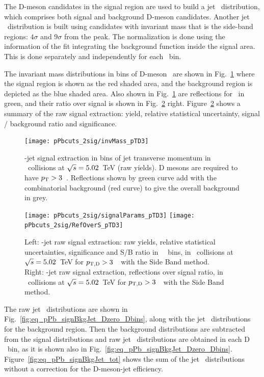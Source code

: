 The D-meson candidates in the signal region are used to build a jet \pt\ distribution, which comprises both signal and background D-meson candidates.
Another jet \pt\ distribution is built using candidates with invariant mass that is the side-band regions: $4\sigma$ and $9\sigma$ from the peak.
The normalization is done using the information of the fit integrating the background function inside the signal area. This is done separately and independently for each \ptd\ bin.


The invariant mass distributions in bins of D-meson \pt\ are shown in Fig.~\ref{fig:eq_pPb_InvMass_Dzero_Dbins} where  the signal region is shown as the red shaded area, and the background region is depicted as the blue shaded area.
Also shown in Fig.~\ref{fig:eq_pPb_InvMass_Dzero_Dbins} are reflections for \Dzero\ in green, and their ratio over signal is shown in Fig.~\ref{fig:eq_pPb_RSU_raw_Dbins_Dzero} right.
Figure~\ref{fig:eq_pPb_RSU_raw_Dbins_Dzero} shows a summary of the raw signal extraction:
yield, relative statistical uncertainty, signal / background ratio and significance.

\begin{figure}[bth]
\centering
\texttt{[image: pPbcuts\_2sig/invMass\_pTD3]}
\caption{\Dzero-jet signal extraction in bins of jet transverse momentum in \pp\ collisions at $\sqrt{s}=5.02$~TeV (raw yields). D mesons are required to have $p_{\rm T}>3$~\GeVc. 
Reflections shown by green curve add with the combinatorial background (red curve) to give the overall background in grey.
}
\label{fig:eq_pPb_InvMass_Dzero_Dbins}
\end{figure}

\begin{figure}[bth]
\centering
\texttt{[image: pPbcuts\_2sig/signalParams\_pTD3]}
\texttt{[image: pPbcuts\_2sig/RefOverS\_pTD3]}
\caption{Left: \Dzero-jet raw signal extraction: raw yields, relative statistical uncertainties, significance and S/B ratio in \Dzero\ \pt\ bins, in \pp\ collisions at $\sqrt{s}=5.02$~TeV for $p_{\mathrm{T,D}}>3$~\GeVc\ with the Side Band method.
\\Right: \Dzero-jet raw signal extraction, reflections over signal ratio, in \pp\ collisions at $\sqrt{s}=5.02$~TeV for $p_{\mathrm{T,D}}>3$~\GeVc\ with the Side Band method.}
\label{fig:eq_pPb_RSU_raw_Dbins_Dzero}
\end{figure}

The raw jet \pt\ distributions are shown in Fig.~\ref{fig:eq_pPb_signBkgJet_Dzero_Dbins}, along with the jet \pt\ distributions for the background region. 
Then the background distributions are subtracted from the signal distributions and raw jet \pt\ distributions are obtained in each D \pt\ bin, 
as it is shown also in Fig.~\ref{fig:eq_pPb_signBkgJet_Dzero_Dbins}.
Figure~\ref{fig:eq_pPb_signBkgJet_tot} shows the sum of the jet \pt\ distributions without a correction for the D-meson-jet efficiency.

